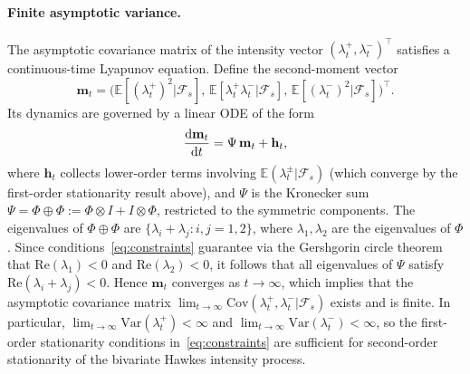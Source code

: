 \documentclass[11pt,a4paper]{article}
\numberwithin{equation}{section}
\theoremstyle{remark}
\theoremstyle{definition}
\newcommand{\E}{{\mathbb{E}}}
\newcommand{\dd}{{\rm d}}
\begin{document}
\paragraph{Finite asymptotic variance.}
The asymptotic covariance matrix of the intensity vector $(\lambda^+_t, \lambda^-_t)^\top$
satisfies a continuous-time Lyapunov equation.
Define the second-moment vector
\[\mathbf{m}_t = \big(\E[(\lambda^+_t)^2|\mathcal{F}_s],\, \E[\lambda^+_t\lambda^-_t|\mathcal{F}_s],\, \E[(\lambda^-_t)^2|\mathcal{F}_s]\big)^\top.\]
Its dynamics are governed by a linear ODE of the form
\begin{align*}
\frac{\dd \mathbf{m}_t}{\dd t} = \Psi\, \mathbf{m}_t + \mathbf{h}_t,
\end{align*}
where $\mathbf{h}_t$ collects lower-order terms involving $\E(\lambda^\pm_t|\mathcal{F}_s)$ (which converge by the first-order stationarity result above),
and $\Psi$ is the Kronecker sum $\Psi = \Phi \oplus \Phi := \Phi \otimes I + I \otimes \Phi$,
restricted to the symmetric components.
The eigenvalues of $\Phi \oplus \Phi$ are $\{\lambda_i + \lambda_j : i,j = 1,2\}$,
where $\lambda_1, \lambda_2$ are the eigenvalues of $\Phi$.
Since conditions~\eqref{eq:constraints} guarantee via the Gershgorin circle theorem that
$\text{Re}(\lambda_1) < 0$ and $\text{Re}(\lambda_2) < 0$,
it follows that all eigenvalues of $\Psi$ satisfy $\text{Re}(\lambda_i + \lambda_j) < 0$.
Hence $\mathbf{m}_t$ converges as $t \to \infty$,
which implies that the asymptotic covariance matrix
$\lim_{t\to\infty}\text{Cov}(\lambda^+_t, \lambda^-_t | \mathcal{F}_s)$
exists and is finite.
In particular, $\lim_{t\to\infty}\text{Var}(\lambda^+_t) < \infty$ and $\lim_{t\to\infty}\text{Var}(\lambda^-_t) < \infty$,
so the first-order stationarity conditions in~\eqref{eq:constraints} are sufficient for second-order stationarity of the bivariate Hawkes intensity process.
\end{document}
